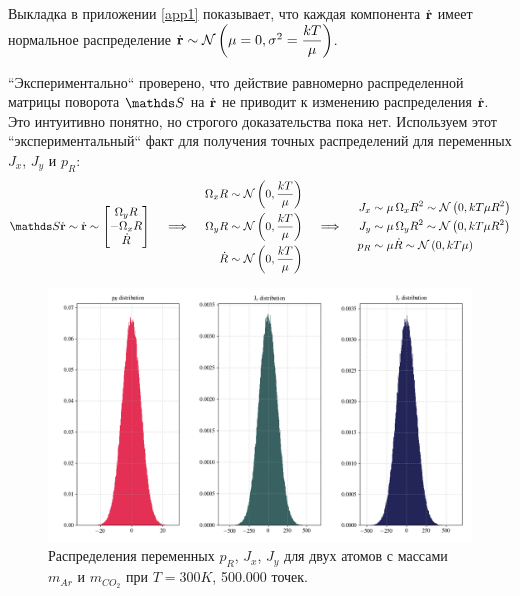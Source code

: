 Выкладка в приложении \ref{app1} показывает, что каждая компонента $\dot{\mathbf{r}}$ имеет нормальное распределение $\dot{\mathbf{r}} \sim \mathcal{N} \left( \mu = 0, \sigma^2 = \displaystyle \frac{kT}{\mu} \right)$. \par
``Экспериментально``  проверено, что действие равномерно распределенной матрицы поворота $\bbS$ на $\dot{\mathbf{r}}$ не приводит к изменению распределения $\dot{\mathbf{r}}$. Это интуитивно понятно, но строгого доказательства пока нет. Используем этот ``экспериментальный``  факт для получения точных распределений для переменных $J_x$, $J_y$ и $p_R$:
\begin{gather}
	\bbS \dot{\mf{r}} \sim \dot{\mf{r}} \sim
	\begin{bmatrix}
		\Omega_y R \\
		- \Omega_x R \\
		\dot{R}
	\end{bmatrix}
	\quad \implies \quad
	\begin{aligned}
			\Omega_x R &\sim \mN \lb 0, \frac{k T}{\mu} \rb \\
			\Omega_y R &\sim \mN \lb 0, \frac{k T}{\mu} \rb \\
			\dot{R} &\sim \mN \lb 0, \frac{k T}{\mu} \rb 
	\end{aligned} \quad \implies \quad  
	\begin{aligned}
			J_x &\sim \mu \, \Omega_x R^2 \sim \mN \lb 0, k T \mu R^2 \rb \\
			J_y &\sim \mu \, \Omega_y R^2 \sim \mN \lb 0, k T \mu R^2 \rb \\
			p_R &\sim \mu \dot{R} \sim \mN \lb 0, k T \mu \rb  
	\end{aligned} \label{distr_exact}
\end{gather}

\begin{figure}[ht!]
		\includegraphics[width=\textwidth]{../pictures/diatomicsDistributions.png}
		\caption{Распределения переменных $p_R$, $J_x$, $J_y$ для двух атомов с массами $m_{Ar}$ и $m_{CO_2}$ при $T = 300 K$, 500.000 точек.}
\end{figure}

